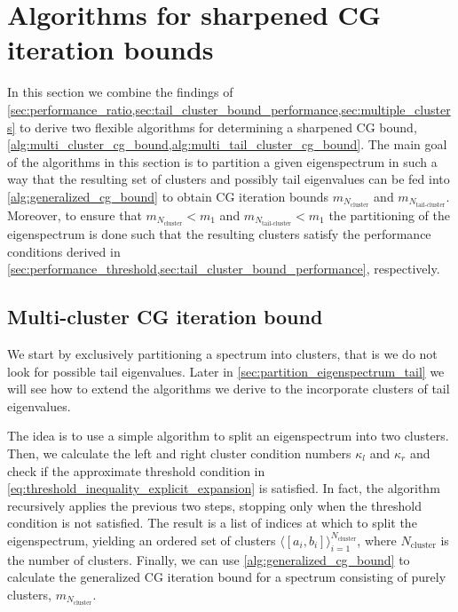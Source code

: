 \section{Algorithms for sharpened CG iteration bounds}\label{sec:cg_iteration_bound_algorithm}
In this section we combine the findings of \cref{sec:performance_ratio,sec:tail_cluster_bound_performance,sec:multiple_clusters} to derive two flexible algorithms for determining a sharpened CG bound, \cref{alg:multi_cluster_cg_bound,alg:multi_tail_cluster_cg_bound}. The main goal of the algorithms in this section is to partition a given eigenspectrum in such a way that the resulting set of clusters and possibly tail eigenvalues can be fed into \cref{alg:generalized_cg_bound} to obtain CG iteration bounds $m_{N_{\text{cluster}}}$ and $m_{N_{\text{tail-cluster}}}$. Moreover, to ensure that $m_{N_{\text{cluster}}} < m_1$ and $m_{N_{\text{tail-cluster}}} < m_1$ the partitioning of the eigenspectrum is done such that the resulting clusters satisfy the performance conditions derived in \cref{sec:performance_threshold,sec:tail_cluster_bound_performance}, respectively.

\subsection{Multi-cluster CG iteration bound}\label{sec:partition_eigenspectrum}
We start by exclusively partitioning a spectrum into clusters, that is we do not look for possible tail eigenvalues. Later in \cref{sec:partition_eigenspectrum_tail} we will see how to extend the algorithms we derive to the incorporate clusters of tail eigenvalues. 

The idea is to use a simple algorithm to split an eigenspectrum into two clusters. Then, we calculate the left and right cluster condition numbers $\kappa_l$ and $\kappa_r$ and check if the approximate threshold condition in \cref{eq:threshold_inequality_explicit_expansion} is satisfied. In fact, the algorithm recursively applies the previous two steps, stopping only when the threshold condition is not satisfied. The result is a list of indices at which to split the eigenspectrum, yielding an ordered set of clusters $\langle[a_i, b_i]\rangle_{i=1}^{N_{\text{cluster}}}$, where $N_{\text{cluster}}$ is the number of clusters. Finally, we can use \cref{alg:generalized_cg_bound} to calculate the generalized CG iteration bound for a spectrum consisting of purely clusters, $m_{N_{\text{cluster}}}$.

